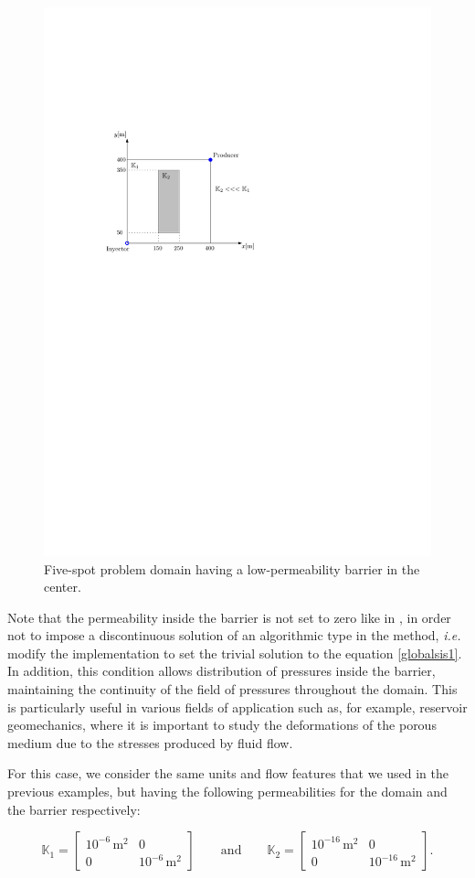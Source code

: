 \documentclass[review]{elsarticle}
\begin{document}
\begin{figure}[H]
	\centering
	\includegraphics[width=0.6\linewidth]{./Figures/Examples/FiveSpot_Hetero/impermeable}
	\caption[Test geometry 1]{Five-spot problem domain having a low-permeability barrier in the center.}
	\label{fig:5puntos1ex2}
\end{figure}
Note that the permeability inside the barrier is not set to zero like in \cite{KATIYAR}, in order not to impose a discontinuous solution of an algorithmic type in the method, \textit{i.e.} modify the implementation to set the trivial solution to the equation \eqref{globalsis1}. In addition, this condition allows distribution of pressures inside the barrier, maintaining the continuity of the field of pressures throughout the domain. This is particularly useful in various fields of application such as, for example, reservoir geomechanics, where it is important to study the deformations of the porous medium due to the stresses produced by fluid flow.

For this case, we consider the same units and flow features that we used in the previous examples, but having the following permeabilities for the domain and the barrier respectively:

\begin{equation}
\mathbb{K}_1 = \left[\begin{array}{cc}
10^{-6} \, \mathrm{m^2} & 0 \\
0 & 10^{-6} \, \mathrm{m^2}
\end{array} \right] \qquad \text{and} \qquad \mathbb{K}_2 = \left[\begin{array}{cc}
10^{-16} \, \mathrm{m^2} & 0 \\
0 & 10^{-16} \, \mathrm{m^2}
\end{array} \right].
\end{equation}
\end{document}
